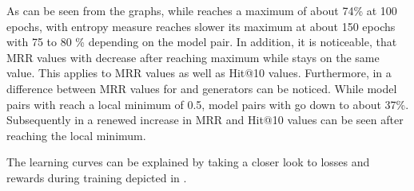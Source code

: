 As can be seen from the graphs, while \origsampling reaches a maximum of about 74\% at 100 epochs, \ussoftmax with entropy measure reaches slower its maximum at about 150 epochs with 75 to 80 \% depending on the model pair.
In addition, it is noticeable, that MRR values with \origsampling decrease after reaching maximum while \ussoftmax stays on the same value.
This applies to MRR values as well as Hit@10 values.
Furthermore, in \origsampling a difference between MRR values for \distmult and \complex generators can be noticed.
While model pairs with \distmult reach a local minimum of 0.5, model pairs with \complex go down to about 37\%.
Subsequently in \origsampling a renewed increase in MRR and Hit@10 values can be seen after reaching the local minimum.

The learning curves can be explained by taking a closer look to losses and rewards during training depicted in .
